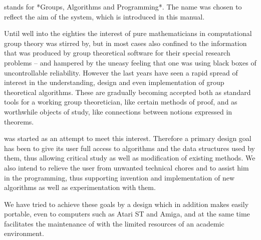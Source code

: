 


{\GAP} stands for *Groups,  Algorithms  and  Programming*.  The name  was
chosen to reflect the  aim of the  system,  which is  introduced in  this
manual.

Until  well into the  eighties  the  interest  of pure mathematicians  in
computational  group theory  was  stirred  by,  but in  most  cases  also
confined to  the  information  that  was  produced  by  group theoretical
software  for  their special research  problems  --  and  hampered by the
uneasy  feeling  that  one  was   using  black  boxes  of  uncontrollable
reliability.  However the last years have seen a rapid spread of interest
in the understanding, design and even implementation of group theoretical
algorithms.  These are gradually becoming accepted both as standard tools
for a working group theoretician,  like certain  methods of proof, and as
worthwhile  objects of study, like  connections between notions expressed
in theorems.

{\GAP} was  started as  an attempt to meet  this  interest.   Therefore a
primary design goal has  been to give its user full access  to algorithms
and the data  structures used  by them, thus  allowing  critical study as
well as  modification of existing methods.  We also intend to relieve the
user from unwanted technical chores and to assist him in the programming,
thus supporting invention and implementation of new algorithms as well as
experimentation with them.

We have tried  to achieve these goals by a design which in addition makes
{\GAP} easily portable, even to computers such as Atari ST and Amiga, and
at the same  time facilitates the maintenance of {\GAP} with  the limited
resources of an academic environment.

